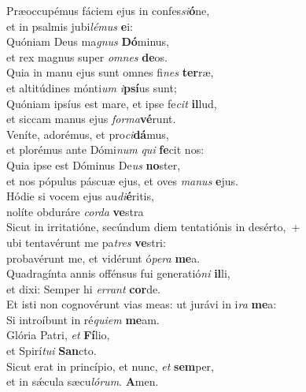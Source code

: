 \evenverse Præoccupémus fáciem ejus in confes\textit{si}\textbf{ó}ne,~\*\\
\evenverse et in psalmis jubi\textit{lé}\textit{mus} \textbf{e}i:\\
\oddverse Quóniam Deus ma\textit{gnus} \textbf{Dó}minus,~\*\\
\oddverse et rex magnus super \textit{om}\textit{nes} \textbf{de}os.\\
\evenverse Quia in manu ejus sunt omnes fi\textit{nes} \textbf{ter}ræ,~\*\\
\evenverse et altitúdines mónti\textit{um} \textit{i}\textbf{psí}us sunt;\\
\oddverse Quóniam ipsíus est mare, et ipse fe\textit{cit} \textbf{il}lud,~\*\\
\oddverse et siccam manus ejus \textit{for}\textit{ma}\textbf{vé}runt.\\
\evenverse Veníte, adorémus, et pro\textit{ci}\textbf{dá}mus,~\*\\
\evenverse et plorémus ante Dómi\textit{num} \textit{qui} \textbf{fe}cit nos:\\
\oddverse Quia ipse est Dóminus De\textit{us} \textbf{no}ster,~\*\\
\oddverse et nos pópulus páscuæ ejus, et oves \textit{ma}\textit{nus} \textbf{e}jus.\\
\evenverse Hódie si vocem ejus au\textit{di}\textbf{é}ritis,~\*\\
\evenverse nolíte obduráre \textit{cor}\textit{da} \textbf{ve}stra\\
\oddverse Sicut in irritatióne, secúndum diem tentatiónis in desérto,~+\\
\oddverse  ubi tentavérunt me pa\textit{tres} \textbf{ve}stri:~\*\\
\oddverse probavérunt me, et vidérunt ó\textit{pe}\textit{ra} \textbf{me}a.\\
\evenverse Quadragínta annis offénsus fui generatió\textit{ni} \textbf{il}li,~\*\\
\evenverse et dixi: Semper hi \textit{er}\textit{rant} \textbf{cor}de.\\
\oddverse Et isti non cognovérunt vias meas: ut jurávi in i\textit{ra} \textbf{me}a:~\*\\
\oddverse Si introíbunt in ré\textit{qui}\textit{em} \textbf{me}am.\\
\evenverse Glória Patri, \textit{et} \textbf{Fí}lio,~\*\\
\evenverse et Spirí\textit{tu}\textit{i} \textbf{San}cto.\\
\oddverse Sicut erat in princípio, et nunc, \textit{et} \textbf{sem}per,~\*\\
\oddverse et in sǽcula sæcu\textit{ló}\textit{rum}. \textbf{A}men.\\

